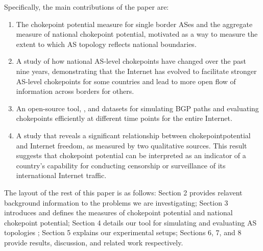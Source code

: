 






\par
Specifically, the main contributions of the paper are: 
\begin{enumerate}
 \item The chokepoint potential measure for single border ASes and the 
 aggregate measure of national chokepoint potential, motivated as a way to measure the extent to which AS topology reflects national boundaries.

 \item A study of how national AS-level chokepoints have changed over the past nine years, demonstrating that the Internet has evolved to facilitate stronger
 AS-level chokepoints for some countries and lead to more open flow of information across borders for others.
 \item An open-source tool, \toolname{}, and datasets for simulating BGP paths and evaluating chokepoints efficiently at different time points for the entire Internet.  
 \item A study that reveals a significant relationship between chokepointpotential and Internet freedom, as measured by two qualitative sources.  This result suggests that chokepoint potential can be interpreted as an indicator of a country's capability for conducting censorship or surveillance of its international Internet traffic.
\end{enumerate}


\par
The layout of the rest of this paper is as follows: Section 2 provides relavent background information
to the problems we are investigating; Section 3 introduces and defines the measures of chokepoint
potential and national chokepoint potential; Section 4 details our tool for simulating and evaluating 
AS topologies \toolname{}; Section 5
explains our experimental setups; Sections 6, 7, and 8 provide results, discussion, and related work
respectively.

